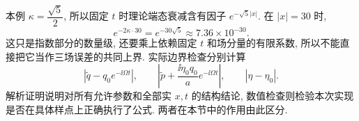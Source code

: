本例 $\kappa=\dfrac{\sqrt{5}}{2}$, 所以固定 $t$ 时理论端态衰减含有因子 $e^{-\sqrt{5}|x|}$. 在 $|x|=30$ 时,
\[
e^{-2\kappa\cdot30}=e^{-30\sqrt{5}}\approx7.36\times10^{-30}.
\]
这只是指数部分的数量级, 还要乘上依赖固定 $t$ 和场分量的有限系数, 所以不能直接把它当作三场误差的共同上界. 实际边界检查分别计算
\[
|\widetilde q-q_0e^{-\ii\Omega t}|,\qquad
\left|\widetilde p+\dfrac{\ii\eta_0q_0}{a}e^{-\ii\Omega t}\right|,\qquad
|\eta-\eta_0|.
\]
解析证明说明对所有允许参数和全部实 $x,t$ 的结构结论, 数值检查则检验本次实现是否在具体样点上正确执行了公式. 两者在本节中的作用由此区分.
